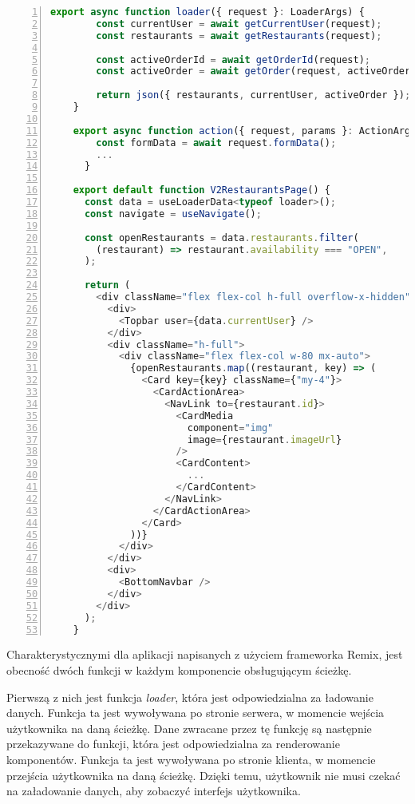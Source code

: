 \begin{lstlisting}[caption={Kod ścieżki wyświetlającej listę dostępnych restauracji - \textit{/v2/ordering/restaurants}},label={lst:client-route},captionpos=b,language=JavaScript,numbers=left,showstringspaces=false]
    export async function loader({ request }: LoaderArgs) {
        const currentUser = await getCurrentUser(request);
        const restaurants = await getRestaurants(request);
      
        const activeOrderId = await getOrderId(request);
        const activeOrder = await getOrder(request, activeOrderId)
      
        return json({ restaurants, currentUser, activeOrder });
    }

    export async function action({ request, params }: ActionArgs) {
        const formData = await request.formData();
        ...
      }
      
    export default function V2RestaurantsPage() {
      const data = useLoaderData<typeof loader>();
      const navigate = useNavigate();
    
      const openRestaurants = data.restaurants.filter(
        (restaurant) => restaurant.availability === "OPEN",
      );
    
      return (
        <div className="flex flex-col h-full overflow-x-hidden">
          <div>
            <Topbar user={data.currentUser} />
          </div>
          <div className="h-full">
            <div className="flex flex-col w-80 mx-auto">
              {openRestaurants.map((restaurant, key) => (
                <Card key={key} className={"my-4"}>
                  <CardActionArea>
                    <NavLink to={restaurant.id}>
                      <CardMedia
                        component="img"
                        image={restaurant.imageUrl}
                      />
                      <CardContent>
                        ...
                      </CardContent>
                    </NavLink>
                  </CardActionArea>
                </Card>
              ))}
            </div>
          </div>
          <div>
            <BottomNavbar />
          </div>
        </div>
      );
    }      
\end{lstlisting}
      
Charakterystycznymi dla aplikacji napisanych z użyciem frameworka Remix, jest obecność dwóch funkcji w każdym komponencie obsługującym ścieżkę. 

Pierwszą z nich jest funkcja \textit{loader}, która jest odpowiedzialna za ładowanie danych. Funkcja ta jest wywoływana po stronie serwera, w momencie wejścia użytkownika na daną ścieżkę. Dane zwracane przez tę funkcję są następnie przekazywane do funkcji, która jest odpowiedzialna za renderowanie komponentów. Funkcja ta jest wywoływana po stronie klienta, w momencie przejścia użytkownika na daną ścieżkę. Dzięki temu, użytkownik nie musi czekać na załadowanie danych, aby zobaczyć interfejs użytkownika. 

